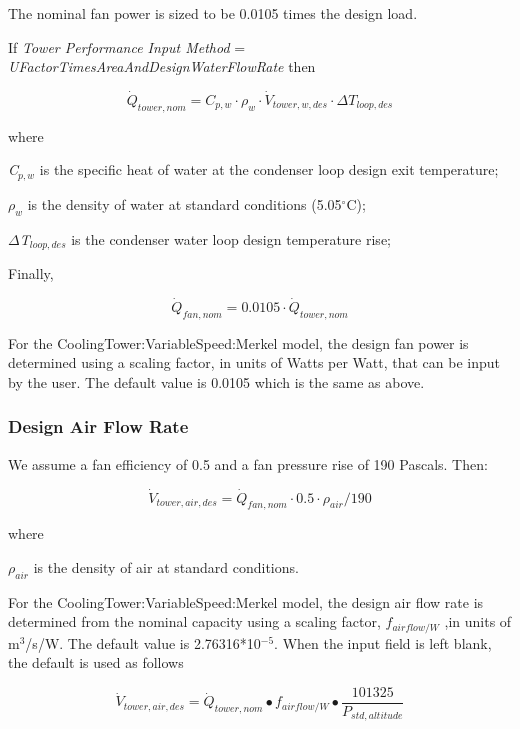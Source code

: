 The nominal fan power is sized to be 0.0105 times the design load.

If \emph{Tower Performance Input Method} = \emph{UFactorTimesAreaAndDesignWaterFlowRate} then

\begin{equation}
\dot Q_{tower,nom} = C_{p,w} \cdot \rho_{w} \cdot \dot V_{tower,w,des} \cdot \Delta T_{loop,des}
\end{equation}

where

\emph{C\(_{p,w}\)} is the specific heat of water at the condenser loop design exit temperature;

\emph{\(\rho_{w}\)} is the density of water at standard conditions (5.05\(^{\circ}\)C);

\emph{\(\Delta\)T\(_{loop,des}\)} is the condenser water loop design temperature rise;

Finally,

\begin{equation}
\dot Q_{fan,nom} = 0.0105\cdot \dot Q_{tower,nom}
\end{equation}

For the CoolingTower:VariableSpeed:Merkel model, the design fan power is determined using a scaling factor, in units of Watts per Watt, that can be input by the user. The default value is 0.0105 which is the same as above.

\subsubsection{Design Air Flow Rate}\label{design-air-flow-rate}

We assume a fan efficiency of 0.5 and a fan pressure rise of 190 Pascals. Then:

\begin{equation}
\dot V_{tower,air,des} = \dot Q_{fan,nom} \cdot 0.5 \cdot \rho_{air} / 190
\end{equation}

where

\(\rho_{air}\) is the density of air at standard conditions.

For the CoolingTower:VariableSpeed:Merkel model, the design air flow rate is determined from the nominal capacity using a scaling factor, \({f_{airflow/W}}\) ,in units of m\(^{3}\)/s/W. The default value is 2.76316*10\(^{-5}\). When the input field is left blank, the default is used as follows

\begin{equation}
{\dot V_{tower,air,des}} = {\dot Q_{tower,nom}} \bullet {f_{airflow/W}} \bullet \frac{{101325}}{{{P_{std,altitude}}}}
\end{equation}

